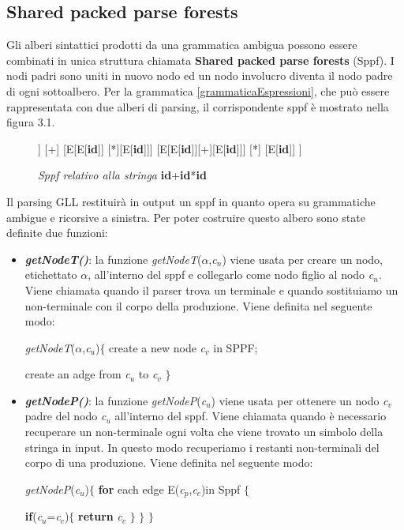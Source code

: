 \subsection{Shared packed parse forests}
Gli alberi sintattici prodotti da una grammatica ambigua \cite{tesi: lr} possono essere combinati in unica struttura chiamata \textbf{Shared packed parse forests} (Sppf). I nodi padri sono uniti in nuovo nodo ed un nodo involucro diventa il nodo padre di ogni sottoalbero. Per la grammatica \ref{grammaticaEspressioni}, che può essere rappresentata con due alberi di parsing, il corrispondente sppf è mostrato nella figura 3.1. 
\begin{figure}[hbpb]
	\centering
	\begin{forest}
	[E
	[E[\textbf{id}]] [+] [E[E[\textbf{id}]] [*][E[\textbf{id}]]]
	[E[E[\textbf{id}]][+][E[\textbf{id}]]] [*] [E[\textbf{id}]]
	]
	\end{forest}
	\caption{\textit{Sppf relativo alla stringa} \textbf{id}+\textbf{id}*\textbf{id} }\label{sppf}
\end{figure}
Il parsing GLL restituirà in output un sppf in quanto opera su grammatiche ambigue e ricorsive a sinistra. Per poter costruire questo albero sono state definite due funzioni:
\begin{itemize}
	\item \textbf{\textit{getNodeT()}}: la funzione \textit{getNodeT}($\alpha$,\textit{c}$_n$) viene usata per creare un nodo, etichettato $\alpha$, all'interno del sppf e collegarlo come nodo figlio al nodo \textit{c}$_n$. Viene chiamata quando il parser trova un terminale e quando sostituiamo un non-terminale con il corpo della produzione. Viene definita nel seguente modo:\par
	\hspace{1.5cm}\textit{getNodeT}($\alpha$,\textit{c}$_u$)$\{$ create a new node \textit{c}$_v$ in SPPF; \par 
	 \hspace{4.6cm}create an adge from \textit{c}$_u$ to \textit{c}$_v$ $\}$
	 \item \textbf{\textit{getNodeP()}}: la funzione \textit{getNodeP}(\textit{c}$_u$) viene usata per ottenere un nodo \textit{c}$_v$ padre del nodo \textit{c}$_u$ all'interno del sppf. Viene chiamata quando è necessario recuperare un non-terminale ogni volta che viene trovato un simbolo della stringa in input. In questo modo recuperiamo i restanti non-terminali del corpo di una produzione. Viene definita nel seguente modo:\par
	 \hspace{1.5cm}\textit{getNodeP}(\textit{c}$_u$)$\{$ \textbf{for} each edge E(\textit{c}$_p$,\textit{c}$_c$)in Sppf $\{$  \par 
	 \hspace{4.4cm}\textbf{if}(\textit{c}$_u$=\textit{c}$_c$)$\{$ \textbf{return} \textit{c}$_c$ $\}$ $\}$ $\}$
\end{itemize}
